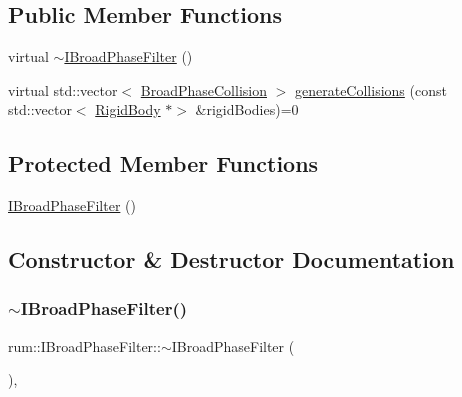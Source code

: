 \subsection*{Public Member Functions}
\begin{DoxyCompactItemize}
\item 
virtual \mbox{\hyperlink{classrum_1_1_i_broad_phase_filter_aecd212a1208bd98dc1dc895640d1b364}{$\sim$\+I\+Broad\+Phase\+Filter}} ()
\item 
virtual std\+::vector$<$ \mbox{\hyperlink{structrum_1_1_broad_phase_collision}{Broad\+Phase\+Collision}} $>$ \mbox{\hyperlink{classrum_1_1_i_broad_phase_filter_a241cca5d9043353d7fb458b65b22eec0}{generate\+Collisions}} (const std\+::vector$<$ \mbox{\hyperlink{classrum_1_1_rigid_body}{Rigid\+Body}} $\ast$$>$ \&rigid\+Bodies)=0
\end{DoxyCompactItemize}
\subsection*{Protected Member Functions}
\begin{DoxyCompactItemize}
\item 
\mbox{\hyperlink{classrum_1_1_i_broad_phase_filter_ae301bb63e91192f2edd60cd258ea02c7}{I\+Broad\+Phase\+Filter}} ()
\end{DoxyCompactItemize}


\subsection{Constructor \& Destructor Documentation}
\mbox{\label{classrum_1_1_i_broad_phase_filter_aecd212a1208bd98dc1dc895640d1b364}} 
\subsubsection{\texorpdfstring{$\sim$\+I\+Broad\+Phase\+Filter()}{~IBroadPhaseFilter()}}
{\footnotesize\ttfamily rum\+::\+I\+Broad\+Phase\+Filter\+::$\sim$\+I\+Broad\+Phase\+Filter (\begin{DoxyParamCaption}{ }\end{DoxyParamCaption})\hspace{0.3cm}{\ttfamily [virtual]}, {\ttfamily [default]}}


